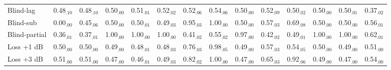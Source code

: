 \begin{tabular}{lccccccccccccc}
Blind-lag & 0.48$_{.10}$ & 0.48$_{.10}$ & 0.50$_{.00}$ & 0.51$_{.01}$ & 0.52$_{.02}$ & 0.52$_{.06}$ & 0.54$_{.06}$ & 0.50$_{.00}$ & 0.52$_{.09}$ & 0.50$_{.02}$ & 0.50$_{.00}$ & 0.50$_{.01}$ & 0.37$_{.02}$\\
Blind-sub & 0.00$_{.00}$ & 0.45$_{.06}$ & 0.50$_{.00}$ & 0.50$_{.01}$ & 0.49$_{.03}$ & 0.95$_{.03}$ & 1.00$_{.00}$ & 0.50$_{.00}$ & 0.57$_{.03}$ & 0.69$_{.08}$ & 0.50$_{.00}$ & 0.50$_{.00}$ & 0.56$_{.01}$\\
Blind-partial & 0.36$_{.01}$ & 0.37$_{.01}$ & 1.00$_{.00}$ & 1.00$_{.00}$ & 1.00$_{.00}$ & 0.41$_{.02}$ & 0.55$_{.02}$ & 0.97$_{.00}$ & 0.42$_{.02}$ & 0.49$_{.01}$ & 1.00$_{.00}$ & 1.00$_{.00}$ & 0.62$_{.01}$\\
Loss +1 dB & 0.50$_{.00}$ & 0.50$_{.00}$ & 0.49$_{.00}$ & 0.48$_{.01}$ & 0.48$_{.03}$ & 0.76$_{.03}$ & 0.98$_{.05}$ & 0.49$_{.00}$ & 0.57$_{.03}$ & 0.54$_{.05}$ & 0.50$_{.00}$ & 0.49$_{.00}$ & 0.51$_{.00}$\\
Loss +3 dB & 0.51$_{.00}$ & 0.51$_{.00}$ & 0.47$_{.00}$ & 0.46$_{.01}$ & 0.49$_{.03}$ & 0.82$_{.02}$ & 1.00$_{.00}$ & 0.47$_{.00}$ & 0.65$_{.03}$ & 0.92$_{.06}$ & 0.49$_{.00}$ & 0.47$_{.00}$ & 0.54$_{.00}$\\
\hline
\end{tabular}